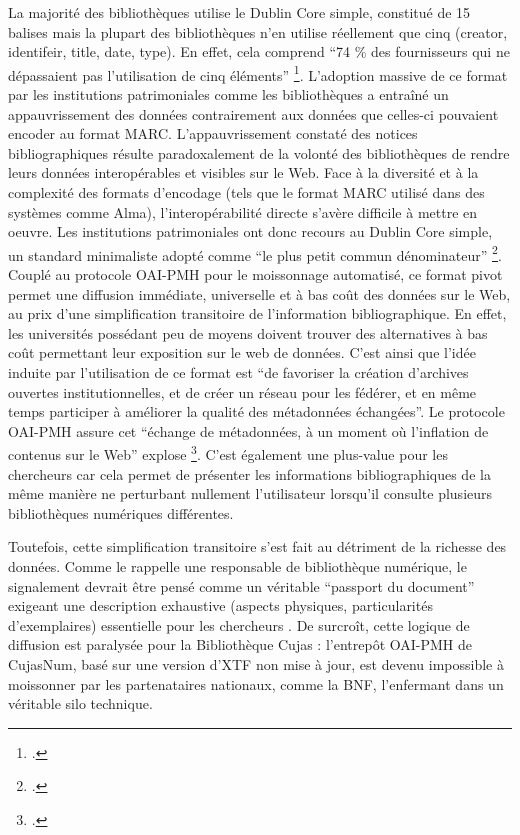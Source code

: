 La majorité des bibliothèques utilise le Dublin Core simple, constitué de 15 balises mais la plupart des bibliothèques n'en utilise réellement que cinq (creator, identifeir, title, date, type). En effet, cela comprend \enquote{74 \% des fournisseurs qui ne dépassaient pas l'utilisation de cinq éléments} \footcite{lavennedelamontoiseOAIPMHPMHLheure2020}. L'adoption massive de ce format par les institutions patrimoniales comme les bibliothèques a entraîné un appauvrissement des données contrairement aux données que celles-ci pouvaient encoder au format MARC. L'appauvrissement constaté des notices bibliographiques résulte paradoxalement de la volonté des bibliothèques de rendre leurs données interopérables et visibles sur le Web. Face à la diversité et à la complexité des formats d'encodage (tels que le format MARC utilisé dans des systèmes comme Alma), l'interopérabilité directe s'avère difficile à mettre en oeuvre. Les institutions patrimoniales ont donc recours au Dublin Core simple, un standard minimaliste adopté comme \enquote{le plus petit commun dénominateur} \footcite{lavennedelamontoiseOAIPMHPMHLheure2020}. Couplé au protocole \ac{OAI-PMH} pour le moissonnage automatisé, ce format pivot permet une diffusion immédiate, universelle et à bas coût des données sur le Web, au prix d'une simplification transitoire de l'information bibliographique. En effet, les universités possédant peu de moyens doivent trouver des alternatives à bas coût permettant leur exposition sur le web de données. C'est ainsi que l'idée induite par l'utilisation de ce format est \enquote{de favoriser la création d'archives ouvertes institutionnelles, et de créer un réseau pour les fédérer, et en même temps participer à améliorer la qualité des métadonnées échangées}. Le protocole \ac{OAI-PMH} assure cet \enquote{échange de métadonnées, à un moment où l'inflation de contenus sur le Web} explose \footcite{lavennedelamontoiseOAIPMHPMHLheure2020}. C'est également une plus-value pour les chercheurs car cela permet de présenter les informations bibliographiques de la même manière ne perturbant nullement l'utilisateur lorsqu'il consulte plusieurs bibliothèques numériques différentes. 

Toutefois, cette simplification transitoire s'est fait au détriment de la richesse des données. Comme le rappelle une responsable de bibliothèque numérique, le signalement devrait être pensé comme un véritable \enquote{passport du document} exigeant une description exhaustive (aspects physiques, particularités d'exemplaires) essentielle pour les chercheurs . De surcroît, cette logique de diffusion est paralysée pour la Bibliothèque Cujas : l'entrepôt \ac{OAI-PMH} de CujasNum, basé sur une version d'\ac{XTF} non mise à jour, est devenu impossible à moissonner par les partenataires nationaux, comme la \ac{BNF}, l'enfermant dans un véritable silo technique. 

